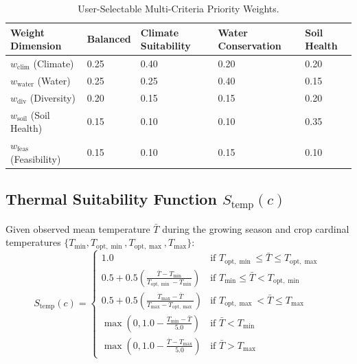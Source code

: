 \documentclass[11pt,a4paper]{report}
\begin{document}
\begin{table}[htbp]
\centering
\small
\caption{User-Selectable Multi-Criteria Priority Weights.}
\label{tab:weights}
\begin{tabularx}{\textwidth}{lXXXX}
\toprule
\textbf{Weight Dimension} & \textbf{Balanced} & \textbf{Climate Suitability} & \textbf{Water Conservation} & \textbf{Soil Health} \\
\midrule
$w_{\text{clim}}$ (Climate) & 0.25 & 0.40 & 0.20 & 0.20 \\
$w_{\text{water}}$ (Water) & 0.25 & 0.25 & 0.40 & 0.15 \\
$w_{\text{div}}$ (Diversity) & 0.20 & 0.15 & 0.15 & 0.20 \\
$w_{\text{soil}}$ (Soil Health) & 0.15 & 0.10 & 0.10 & 0.35 \\
$w_{\text{feas}}$ (Feasibility) & 0.15 & 0.10 & 0.15 & 0.10 \\
\bottomrule
\end{tabularx}
\end{table}

\subsection{Thermal Suitability Function $S_{\text{temp}}(c)$}
Given observed mean temperature $\bar{T}$ during the growing season and crop cardinal temperatures $\{T_{\min}, T_{\text{opt},\min}, T_{\text{opt},\max}, T_{\max}\}$:
\begin{equation}
  S_{\text{temp}}(c) = \begin{cases}
    1.0 & \text{if } T_{\text{opt},\min} \le \bar{T} \le T_{\text{opt},\max} \\
    0.5 + 0.5 \left( \frac{\bar{T} - T_{\min}}{T_{\text{opt},\min} - T_{\min}} \right) & \text{if } T_{\min} \le \bar{T} < T_{\text{opt},\min} \\
    0.5 + 0.5 \left( \frac{T_{\max} - \bar{T}}{T_{\max} - T_{\text{opt},\max}} \right) & \text{if } T_{\text{opt},\max} < \bar{T} \le T_{\max} \\
    \max\left(0, 1.0 - \frac{T_{\min} - \bar{T}}{5.0}\right) & \text{if } \bar{T} < T_{\min} \\
    \max\left(0, 1.0 - \frac{\bar{T} - T_{\max}}{5.0}\right) & \text{if } \bar{T} > T_{\max}
  \end{cases}
\end{equation}
\end{document}
